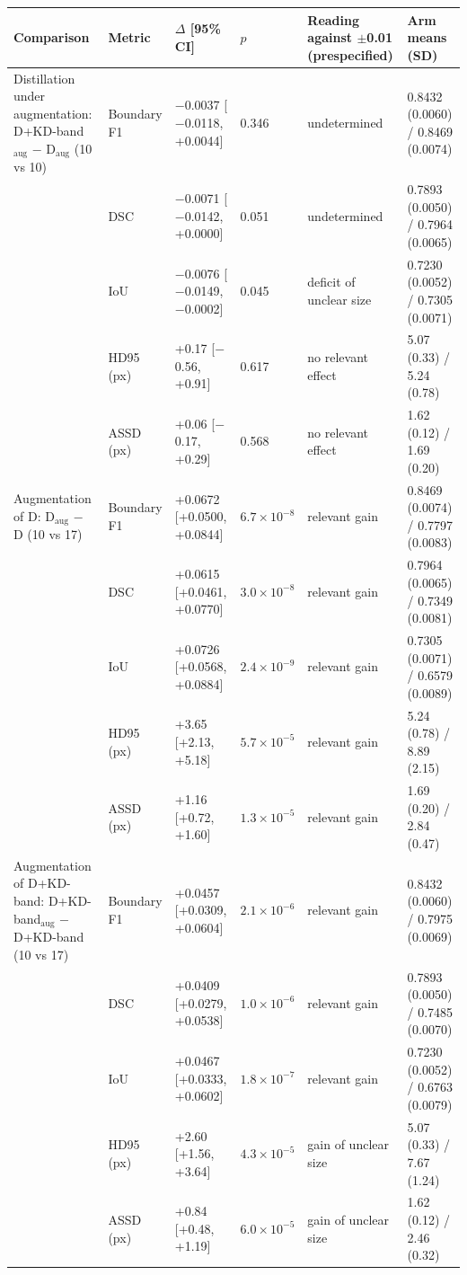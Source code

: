 \begin{tabular}{@{}llllll@{}}
\toprule
Comparison & Metric & $\Delta$ [95\% CI] & $p$ & Reading against $\pm$0.01 (prespecified) & Arm means (SD) \\
\midrule
Distillation under augmentation: D+KD-band$_{\mathrm{aug}}$ $-$ D$_{\mathrm{aug}}$ (10 vs 10) & Boundary F1 & $-$0.0037 [$-$0.0118, +0.0044] & 0.346 & undetermined & 0.8432 (0.0060) / 0.8469 (0.0074) \\
 & DSC & $-$0.0071 [$-$0.0142, +0.0000] & 0.051 & undetermined & 0.7893 (0.0050) / 0.7964 (0.0065) \\
 & IoU & $-$0.0076 [$-$0.0149, $-$0.0002] & 0.045 & deficit of unclear size & 0.7230 (0.0052) / 0.7305 (0.0071) \\
 & HD95 (px) & +0.17 [$-$0.56, +0.91] & 0.617 & no relevant effect & 5.07 (0.33) / 5.24 (0.78) \\
 & ASSD (px) & +0.06 [$-$0.17, +0.29] & 0.568 & no relevant effect & 1.62 (0.12) / 1.69 (0.20) \\
\midrule
Augmentation of D: D$_{\mathrm{aug}}$ $-$ D (10 vs 17) & Boundary F1 & +0.0672 [+0.0500, +0.0844] & $6.7\times10^{-8}$ & relevant gain & 0.8469 (0.0074) / 0.7797 (0.0083) \\
 & DSC & +0.0615 [+0.0461, +0.0770] & $3.0\times10^{-8}$ & relevant gain & 0.7964 (0.0065) / 0.7349 (0.0081) \\
 & IoU & +0.0726 [+0.0568, +0.0884] & $2.4\times10^{-9}$ & relevant gain & 0.7305 (0.0071) / 0.6579 (0.0089) \\
 & HD95 (px) & +3.65 [+2.13, +5.18] & $5.7\times10^{-5}$ & relevant gain & 5.24 (0.78) / 8.89 (2.15) \\
 & ASSD (px) & +1.16 [+0.72, +1.60] & $1.3\times10^{-5}$ & relevant gain & 1.69 (0.20) / 2.84 (0.47) \\
\midrule
Augmentation of D+KD-band: D+KD-band$_{\mathrm{aug}}$ $-$ D+KD-band (10 vs 17) & Boundary F1 & +0.0457 [+0.0309, +0.0604] & $2.1\times10^{-6}$ & relevant gain & 0.8432 (0.0060) / 0.7975 (0.0069) \\
 & DSC & +0.0409 [+0.0279, +0.0538] & $1.0\times10^{-6}$ & relevant gain & 0.7893 (0.0050) / 0.7485 (0.0070) \\
 & IoU & +0.0467 [+0.0333, +0.0602] & $1.8\times10^{-7}$ & relevant gain & 0.7230 (0.0052) / 0.6763 (0.0079) \\
 & HD95 (px) & +2.60 [+1.56, +3.64] & $4.3\times10^{-5}$ & gain of unclear size & 5.07 (0.33) / 7.67 (1.24) \\
 & ASSD (px) & +0.84 [+0.48, +1.19] & $6.0\times10^{-5}$ & gain of unclear size & 1.62 (0.12) / 2.46 (0.32) \\
\bottomrule
\end{tabular}
